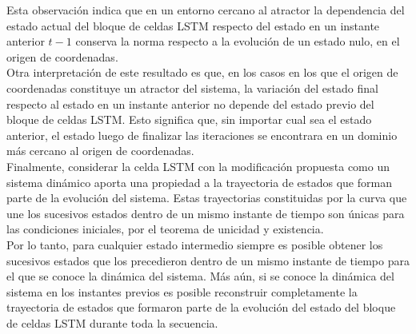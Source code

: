 \documentclass{article}
\begin{document}
	Esta observación indica que en un entorno cercano al atractor la dependencia del estado actual del bloque de celdas LSTM respecto del estado en un instante anterior $t-1$ conserva la norma respecto a la evolución de un estado nulo, en el origen de coordenadas.\\
	Otra interpretación de este resultado es que, en los casos en los que el origen de coordenadas constituye un atractor del sistema, la variación del estado final respecto al estado en un instante anterior no depende del estado previo del bloque de celdas LSTM. Esto significa que, sin importar cual sea el estado anterior, el estado luego de finalizar las iteraciones se encontrara en un dominio más cercano al origen de coordenadas.\\
	
	Finalmente, considerar la celda LSTM con la modificación propuesta como un sistema dinámico aporta una propiedad a la trayectoria de estados que forman parte de la evolución del sistema. Estas trayectorias constituidas por la curva que une los sucesivos estados dentro de un mismo instante de tiempo son únicas para las condiciones iniciales, por el teorema de unicidad y existencia.\\
	Por lo tanto, para cualquier estado intermedio siempre es posible obtener los sucesivos estados que los precedieron dentro de un mismo instante de tiempo para el que se conoce la dinámica del sistema. Más aún, si se conoce la dinámica del sistema en los instantes previos es posible reconstruir completamente la trayectoria de estados que formaron parte de la evolución del estado del bloque de celdas LSTM durante toda la secuencia.
	
\end{document}
